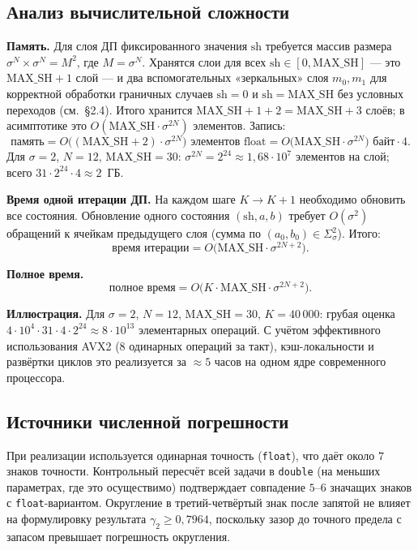 \subsection{Анализ вычислительной сложности}

\textbf{Память.}
Для слоя ДП фиксированного значения $\mathrm{sh}$ требуется массив размера $\sigma^N \times \sigma^N = M^2$, где $M = \sigma^N$. Хранятся слои для всех $\mathrm{sh} \in [0, \mathrm{MAX\_SH}]$ --- это $\mathrm{MAX\_SH} + 1$ слой --- и два вспомогательных «зеркальных» слоя $m_0, m_1$ для корректной обработки граничных случаев $\mathrm{sh} = 0$ и $\mathrm{sh} = \mathrm{MAX\_SH}$ без условных переходов (см.~\S2.4). Итого хранится $\mathrm{MAX\_SH} + 1 + 2 = \mathrm{MAX\_SH} + 3$ слоёв; в асимптотике это $O(\mathrm{MAX\_SH} \cdot \sigma^{2N})$ элементов. Запись:
\[
    \text{память} = O\bigl((\mathrm{MAX\_SH} + 2) \cdot \sigma^{2N}\bigr) \text{ элементов float} = O\bigl(\mathrm{MAX\_SH} \cdot \sigma^{2N}\bigr) \text{ байт} \cdot 4.
\]
Для $\sigma = 2$, $N = 12$, $\mathrm{MAX\_SH} = 30$: $\sigma^{2N} = 2^{24} \approx 1{,}68 \cdot 10^7$ элементов на слой; всего $31 \cdot 2^{24} \cdot 4 \approx 2$~ГБ.

\textbf{Время одной итерации ДП.}
На каждом шаге $K \to K+1$ необходимо обновить все состояния. Обновление одного состояния $(\mathrm{sh}, a, b)$ требует $O(\sigma^2)$ обращений к ячейкам предыдущего слоя (сумма по $(a_0, b_0) \in \Sigma_\sigma^2$). Итого:
\[
    \text{время итерации} = O\bigl(\mathrm{MAX\_SH} \cdot \sigma^{2N + 2}\bigr).
\]

\textbf{Полное время.}
\[
    \text{полное время} = O\bigl(K \cdot \mathrm{MAX\_SH} \cdot \sigma^{2N + 2}\bigr).
\]

\textbf{Иллюстрация.}
Для $\sigma = 2$, $N = 12$, $\mathrm{MAX\_SH} = 30$, $K = 40\,000$: грубая оценка $4 \cdot 10^4 \cdot 31 \cdot 4 \cdot 2^{24} \approx 8 \cdot 10^{13}$ элементарных операций. С учётом эффективного использования AVX2 (8 одинарных операций за такт), кэш-локальности и развёртки циклов это реализуется за $\approx 5$ часов на одном ядре современного процессора.

\subsection{Источники численной погрешности}

При реализации используется одинарная точность (\texttt{float}), что даёт около $7$ знаков точности. Контрольный пересчёт всей задачи в \texttt{double} (на меньших параметрах, где это осуществимо) подтверждает совпадение $5$--$6$ значащих знаков с \texttt{float}-вариантом. Округление в третий-четвёртый знак после запятой не влияет на формулировку результата $\gamma_2 \geq 0{,}7964$, поскольку зазор до точного предела с запасом превышает погрешность округления.


